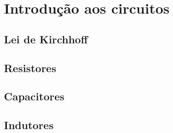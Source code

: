\section{Introdução aos circuitos}

\subsection{Lei de Kirchhoff}
\lipsum[1-2][1-6]

\subsection{Resistores}
\lipsum[1-2][1-6]

\subsection{Capacitores}
\lipsum[1-2][1-6]

\subsection{Indutores}
\lipsum[1-2][1-6]